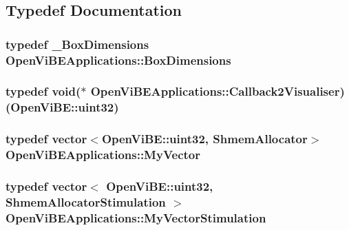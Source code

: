 \subsection{Typedef Documentation}
\hypertarget{namespaceOpenViBEApplications_a0eb6bc715238261bf0c5408643a50708}{
\subsubsection[{BoxDimensions}]{\setlength{\rightskip}{0pt plus 5cm}typedef {\bf \_\-BoxDimensions} {\bf OpenViBEApplications::BoxDimensions}}}
\label{namespaceOpenViBEApplications_a0eb6bc715238261bf0c5408643a50708}
\hypertarget{namespaceOpenViBEApplications_a3cd8eac2f1ee289a3a5a2fda466ffc97}{
\subsubsection[{Callback2Visualiser}]{\setlength{\rightskip}{0pt plus 5cm}typedef void($\ast$ {\bf OpenViBEApplications::Callback2Visualiser})(OpenViBE::uint32)}}
\label{namespaceOpenViBEApplications_a3cd8eac2f1ee289a3a5a2fda466ffc97}
\hypertarget{namespaceOpenViBEApplications_a190a1df7f170704bb87c3b1cc3df3641}{
\subsubsection[{MyVector}]{\setlength{\rightskip}{0pt plus 5cm}typedef vector$<$OpenViBE::uint32, {\bf ShmemAllocator}$>$ {\bf OpenViBEApplications::MyVector}}}
\label{namespaceOpenViBEApplications_a190a1df7f170704bb87c3b1cc3df3641}
\hypertarget{namespaceOpenViBEApplications_a76138bc86fc2d1d552722e25bdcaf890}{
\subsubsection[{MyVectorStimulation}]{\setlength{\rightskip}{0pt plus 5cm}typedef vector$<$ OpenViBE::uint32, {\bf ShmemAllocatorStimulation} $>$ {\bf OpenViBEApplications::MyVectorStimulation}}}

